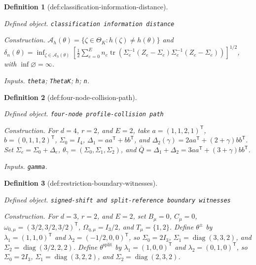 \documentclass{article}
\newtheorem{definition}{Definition}
\begin{document}
\begin{definition}[def:classification-information-distance]\label{def:classification-information-distance}
\par\smallskip\noindent\emph{Defined object.} \texttt{classification information distance}
\par\smallskip\noindent\emph{Construction.} \(\mathcal A_h(\theta)=\{\zeta\in\Theta_K:h(\zeta)\ne h(\theta)\}\) and \(\delta_n(\theta)=\inf_{\zeta\in\mathcal A_h(\theta)}[\tfrac12\sum_{e=0}^{E}n_e\operatorname{tr}(\Sigma_e^{-1}(Z_e-\Sigma_e)\Sigma_e^{-1}(Z_e-\Sigma_e))]^{1/2}\), with \(\inf\varnothing=\infty\).
\par\smallskip\noindent\emph{Inputs.} \texttt{theta}; \texttt{ThetaK}; \texttt{h}; \texttt{n}.
\end{definition}

\begin{definition}[def:four-node-collision-path]\label{def:four-node-collision-path}
\par\smallskip\noindent\emph{Defined object.} \texttt{four-\allowbreak{}node profile-\allowbreak{}collision path}
\par\smallskip\noindent\emph{Construction.} For \(d=4\), \(r=2\), and \(E=2\), take \(a=(1,1,2,1)^{\mathsf T}\), \(b=(0,1,1,2)^{\mathsf T}\), \(\Sigma_0=I_4\), \(\Delta_1=aa^{\mathsf T}+bb^{\mathsf T}\), and \(\Delta_2(\gamma)=2aa^{\mathsf T}+(2+\gamma)bb^{\mathsf T}\).  Set \(\Sigma_e=\Sigma_0+\Delta_e\), \(\theta_\gamma=(\Sigma_0,\Sigma_1,\Sigma_2)\), and \(\bar Q=\Delta_1+\Delta_2=3aa^{\mathsf T}+(3+\gamma)bb^{\mathsf T}\).
\par\smallskip\noindent\emph{Inputs.} \texttt{gamma}.
\end{definition}

\begin{definition}[def:restriction-boundary-witnesses]\label{def:restriction-boundary-witnesses}
\par\smallskip\noindent\emph{Defined object.} \texttt{signed-\allowbreak{}shift and split-\allowbreak{}reference boundary witnesses}
\par\smallskip\noindent\emph{Construction.} For \(d=3\), \(r=2\), and \(E=2\), set \(B_{\mu}=0\), \(C_{\mu}=0\), \(\omega_{0,\mu}=(3/2,3/2,3/2)^{\mathsf T}\), \(\Omega_{\eta,\mu}=I_3/2\), and \(T_{\mu}=\{1,2\}\).  Define \(\theta^{\pm}\) by \(\lambda_1=(1,1,0)^{\mathsf T}\) and \(\lambda_2=(-1/2,0,0)^{\mathsf T}\), so \(\Sigma_0=2I_3\), \(\Sigma_1=\operatorname{diag}(3,3,2)\), and \(\Sigma_2=\operatorname{diag}(3/2,2,2)\).  Define \(\theta^{\mathrm{split}}\) by \(\lambda_1=(1,0,0)^{\mathsf T}\) and \(\lambda_2=(0,1,0)^{\mathsf T}\), so \(\Sigma_0=2I_3\), \(\Sigma_1=\operatorname{diag}(3,2,2)\), and \(\Sigma_2=\operatorname{diag}(2,3,2)\).
\end{definition}
\end{document}
